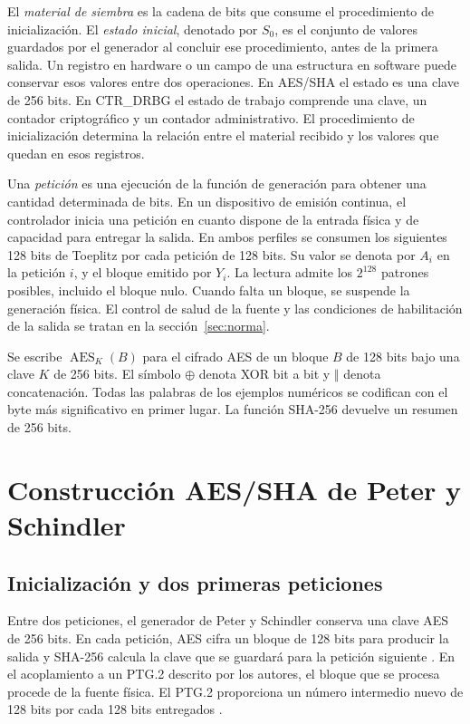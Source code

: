 \documentclass[11pt,a4paper]{article}
\newcommand{\Enc}{\operatorname{AES}}
\newcommand{\cat}{\mathbin\Vert}
\begin{document}
El \emph{material de siembra} es la cadena de bits que consume el procedimiento de inicialización. El \emph{estado inicial}, denotado por \(S_0\), es el conjunto de valores guardados por el generador al concluir ese procedimiento, antes de la primera salida. Un registro en hardware o un campo de una estructura en software puede conservar esos valores entre dos operaciones. En AES/SHA el estado es una clave de 256 bits. En CTR\_DRBG el estado de trabajo comprende una clave, un contador criptográfico y un contador administrativo. El procedimiento de inicialización determina la relación entre el material recibido y los valores que quedan en esos registros.

Una \emph{petición} es una ejecución de la función de generación para obtener una cantidad determinada de bits. En un dispositivo de emisión continua, el controlador inicia una petición en cuanto dispone de la entrada física y de capacidad para entregar la salida. En ambos perfiles se consumen los siguientes 128 bits de Toeplitz por cada petición de 128 bits. Su valor se denota por \(A_i\) en la petición \(i\), y el bloque emitido por \(Y_i\). La lectura admite los \(2^{128}\) patrones posibles, incluido el bloque nulo. Cuando falta un bloque, se suspende la generación física. El control de salud de la fuente y las condiciones de habilitación de la salida se tratan en la sección~\ref{sec:norma}.

Se escribe \(\Enc_K(B)\) para el cifrado AES de un bloque \(B\) de 128 bits bajo una clave \(K\) de 256 bits. El símbolo \(\oplus\) denota XOR bit a bit y \(\cat\) denota concatenación. Todas las palabras de los ejemplos numéricos se codifican con el byte más significativo en primer lugar. La función SHA-256 devuelve un resumen de 256 bits.

\section{Construcción AES/SHA de Peter y Schindler}\label{sec:ais}
\subsection{Inicialización y dos primeras peticiones}
Entre dos peticiones, el generador de Peter y Schindler conserva una clave AES de 256 bits. En cada petición, AES cifra un bloque de 128 bits para producir la salida y SHA-256 calcula la clave que se guardará para la petición siguiente \cite[párr.~996, p.~203]{ais}. En el acoplamiento a un PTG.2 descrito por los autores, el bloque que se procesa procede de la fuente física. El PTG.2 proporciona un número intermedio nuevo de 128 bits por cada 128 bits entregados \cite[párr.~390(iii), p.~78]{ais}.
\end{document}
